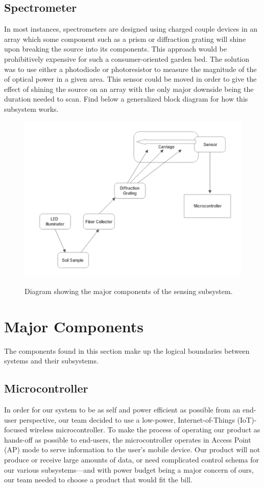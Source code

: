 \documentclass[journal]{IEEEtran}
\begin{document}
\subsection{Spectrometer}
In most instances, spectrometers are designed using charged couple devices in an array which some
component such as a prism or diffraction grating will shine upon breaking the source into its
components. This approach would be prohibitively expensive for such a consumer-oriented garden
bed. The solution was to use either a photodiode or photoresistor to measure the magnitude of the
of optical power in a given area\cite{Cao}. This sensor could be moved in order to give the effect of shining
the source on an array with the only major downside being the duration needed to scan. Find below a
generalized block diagram for how this subsystem works.
\begin{figure}[H]
	\centering
	\includegraphics[width=\linewidth]{images/OpticsBlockDiagram.png}
	\label{fig:sensing-block}
	\caption{Diagram showing the major components of the sensing subsystem.}
\end{figure}
\section{Major Components} \label{sec:major-components}
The components found in this section make up the logical boundaries between systems and their
subsystems.
\subsection{Microcontroller}
In order for our system to be as self and power efficient as possible from an end-user perspective, our team decided to use a low-power, Internet-of-Things (IoT)-focused wireless microcontroller. To make the process of operating our product as hands-off as possible to end-users, the microcontroller operates in Access Point (AP) mode to serve information to the user's mobile device. Our product will not produce or receive large amounts of data, or need complicated control schema for our various subsystems---and with power budget being a major concern of ours, our team needed to choose a product that would fit the bill.
\end{document}
